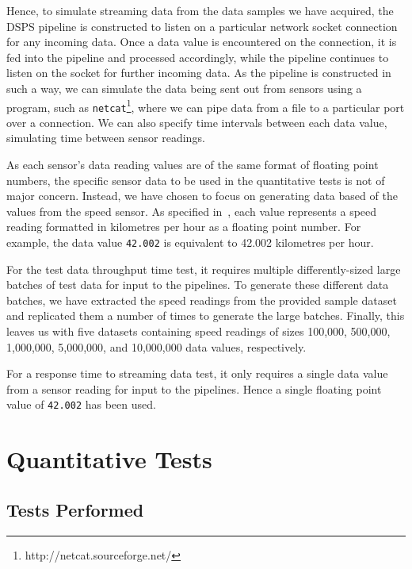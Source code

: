 Hence, to simulate streaming data from the data samples we have acquired, the DSPS pipeline is constructed to listen on
a particular network socket connection for any incoming data. Once a data value is encountered on the connection, it is fed into
the pipeline and processed accordingly, while the pipeline continues to listen on the socket for further incoming data.
As the pipeline is constructed in such a way, we can simulate the data being sent out from sensors using a program, such
as \texttt{netcat}\footnote{http://netcat.sourceforge.net/}, where we can pipe data from a file to a particular
port over a connection. We can also specify time intervals between each data value, simulating time between sensor readings.

As each sensor's data reading values are of the same format of floating point numbers,
the specific sensor data to be used in the quantitative tests is not of major concern. Instead, we have chosen to focus on
generating data based of the values from the speed sensor. As specified in~, each value represents
a speed reading formatted in kilometres per hour as a floating point number. For example, the data value \texttt{42.002}
is equivalent to 42.002 kilometres per hour.

For the test data throughput time test, it requires multiple differently-sized large batches of test data for input
to the pipelines. To generate these different data batches, we have extracted the speed readings from the provided sample dataset
and replicated them a number of times to generate the large batches. Finally, this leaves us with five datasets containing
speed readings of sizes 100,\@000, 500,\@000, 1,\@000,\@000, 5,\@000,\@000, and 10,\@000,\@000 data values, respectively.

For a response time to streaming data test, it only requires a single data value from a sensor reading for input to the
pipelines. Hence a single floating point value of \texttt{42.002} has been used.



\section{Quantitative Tests} %
\label{sub:quantitative_tests}

\subsection{Tests Performed} %
\label{ssub:quan_tests_performed}

